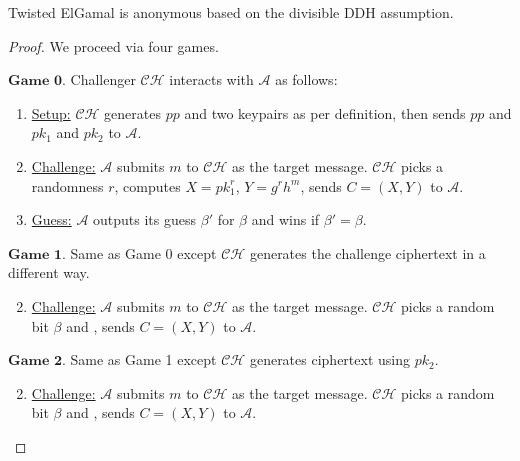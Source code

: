 \documentclass[a4paper,10pt]{article}
\begin{document}
\begin{theorem}\label{theorem:anonymity}
Twisted ElGamal is anonymous based on the divisible DDH assumption. 
\end{theorem}
\begin{proof}
We proceed via four games. 
\begin{trivlist}
\item $\textbf{Game 0.}$ Challenger $\mathcal{CH}$ interacts with $\mathcal{A}$ as follows: 
\begin{enumerate}
\item \underline{Setup:} $\mathcal{CH}$ generates $pp$ and two keypairs as per definition, 
    then sends $pp$ and $pk_1$ and $pk_2$ to $\mathcal{A}$. 

\item \underline{Challenge:} $\mathcal{A}$ submits $m$ to $\mathcal{CH}$ as the target message. 
    $\mathcal{CH}$ picks a randomness $r$, computes $X = pk_1^r$, $Y = g^r h^m$, 
    sends $C = (X, Y)$ to $\mathcal{A}$.   

\item \underline{Guess:} $\mathcal{A}$ outputs its guess $\beta'$ for $\beta$ and wins if $\beta' = \beta$. 
\end{enumerate}
\end{trivlist}

\begin{trivlist}
\item $\textbf{Game 1.}$ Same as Game 0 except $\mathcal{CH}$ generates the challenge ciphertext in a different way.  

\begin{enumerate}\setcounter{enumi}{1}
\item \underline{Challenge:} $\mathcal{A}$ submits $m$ to $\mathcal{CH}$ as the target message. 
    $\mathcal{CH}$ picks a random bit $\beta$ and , sends $C = (X, Y)$ to $\mathcal{A}$.   
\end{enumerate}
\end{trivlist}

\begin{trivlist}
\item $\textbf{Game 2.}$ Same as Game 1 except $\mathcal{CH}$ generates ciphertext using $pk_2$.  

\begin{enumerate}\setcounter{enumi}{1}
\item \underline{Challenge:} $\mathcal{A}$ submits $m$ to $\mathcal{CH}$ as the target message. 
    $\mathcal{CH}$ picks a random bit $\beta$ and , sends $C = (X, Y)$ to $\mathcal{A}$.   
\end{enumerate}
\end{trivlist}


\end{proof}
\end{document}
